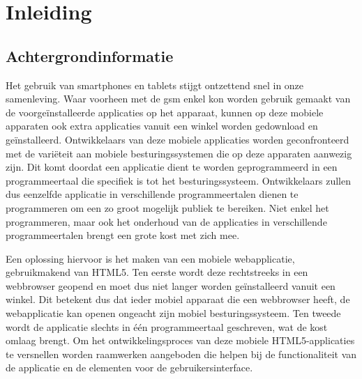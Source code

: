 
\chapter{Inleiding} %
\label{inleiding}

\section{Achtergrondinformatie} %

Het gebruik van smartphones en tablets stijgt ontzettend snel in onze samenleving.
Waar voorheen met de gsm enkel kon worden gebruik gemaakt van de voorgeïnstalleerde applicaties op het apparaat, kunnen op deze mobiele apparaten ook extra applicaties vanuit een winkel worden gedownload en geïnstalleerd.
Ontwikkelaars van deze mobiele applicaties worden geconfronteerd met de variëteit aan mobiele besturingssystemen die op deze apparaten aanwezig zijn.
Dit komt doordat een applicatie dient te worden geprogrammeerd in een programmeertaal die specifiek is tot het besturingssysteem.
Ontwikkelaars zullen dus eenzelfde applicatie in verschillende programmeertalen dienen te programmeren om een zo groot mogelijk publiek te bereiken.
Niet enkel het programmeren, maar ook het onderhoud van de applicaties in verschillende programmeertalen brengt een grote kost met zich mee.

Een oplossing hiervoor is het maken van een mobiele webapplicatie, gebruikmakend van HTML5.
Ten eerste wordt deze rechtstreeks in een webbrowser geopend en moet dus niet langer worden geïnstalleerd vanuit een winkel.
Dit betekent dus dat ieder mobiel apparaat die een webbrowser heeft, de webapplicatie kan openen ongeacht zijn mobiel besturingssysteem.
Ten tweede wordt de applicatie slechts in één programmeertaal geschreven, wat de kost omlaag brengt.
Om het ontwikkelingsproces van deze mobiele HTML5-applicaties te versnellen worden raamwerken aangeboden die helpen bij de functionaliteit van de applicatie en de elementen voor de gebruikersinterface. 

